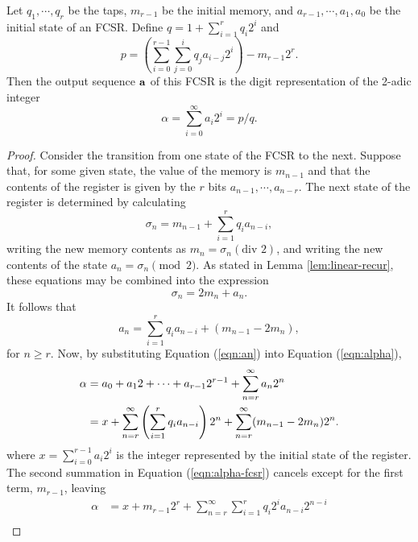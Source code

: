 \begin{proposition}{\rm \cite{art:kg97}}\label{prop:FCSR-seq}
  Let $q_1,\cdots,q_r$ be the taps, $m_{r-1}$ be the initial memory, and
  $a_{r-1},\cdots,a_1,a_0$ be the initial state of an FCSR. Define
  $q=1+\sum_{i=1}^{r}q_i2^i$ and
  \begin{equation*}
    p=\left(\sum_{i=0}^{r-1}\sum_{j=0}^iq_ja_{i-j}2^i\right)-m_{r-1}2^r.
  \end{equation*}
  Then the output sequence ${\bf a}$ of this FCSR is the digit representation of
  the 2-adic integer
  \begin{equation}\label{eqn:alpha}
    \alpha=\sum_{i=0}^\infty a_i2^i=p/q.
  \end{equation}
\end{proposition}
\begin{proof}
  Consider the transition from one state of the FCSR to the next. Suppose that,
  for some given state, the value of the memory is $m_{n-1}$ and that the
  contents of the register is given by the $r$ bits $a_{n-1},\cdots,a_{n-r}$.
  The next state of the register is determined by calculating
  \begin{equation*}
    \sigma_n=m_{n-1}+\sum_{i=1}^rq_ia_{n-i},
  \end{equation*}
  writing the new memory contents as $m_n=\sigma_n(\text{div }2)$, and writing
  the new contents of the state $a_n=\sigma_n\pmod2$. As stated in Lemma
  \ref{lem:linear-recur}, these equations may be combined into the expression
  \[
    \sigma_n=2m_n+a_n.
  \]
  It follows that
  \begin{equation}\label{eqn:an}
    a_n=\sum_{i=1}^rq_ia_{n-i}+(m_{n-1}-2m_n),
  \end{equation}
  for $n\geq r$. Now, by substituting Equation (\ref{eqn:an}) into Equation
  (\ref{eqn:alpha}),
  \begin{align}
    \alpha&=a_0+a_1 2+\cdots+a_{r-1}2^{r-1}+\sum_{n=r}^\infty a_n2^n \notag\\
          &=x+\sum_{n=r}^\infty\left( \sum_{i=1}^r q_ia_{n-i} \right)2^n
          +\sum_{n=r}^\infty (m_{n-1}-2m_n)2^n. \label{eqn:alpha-fcsr}
  \end{align}
  where $x=\sum_{i=0}^{r-1}a_i2^i$ is the integer represented by the initial
  state of the register. The second summation in Equation (\ref{eqn:alpha-fcsr})
  cancels except for the first term, $m_{r-1}$, leaving
  \begin{align*}
    \alpha&=x+m_{r-1}2^r+\sum_{n=r}^\infty\sum_{i=1}^r q_i2^ia_{n-i}2^{n-i}\\

\end{align*}
\end{proof}
